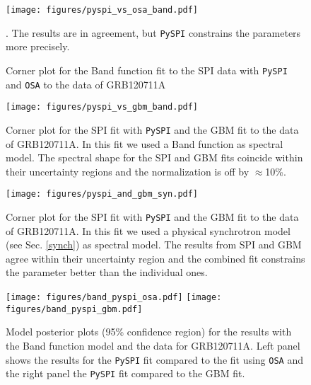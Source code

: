 \documentclass[twocolumn,traditabstract]{aa}
\begin{document}
\begin{figure}
  \begin{centering}
    \texttt{[image: figures/pyspi\_vs\_osa\_band.pdf]}
    \caption{Corner plot for the Band function fit to the SPI data with {\tt PySPI} and {\tt OSA} to the data of GRB120711A}. The results are in agreement, but {\tt PySPI} constrains the parameters more precisely.
    \label{fig:corner_osa_pyspi_band}
  \end{centering}
\end{figure}
\begin{figure}
  \begin{centering}
    \texttt{[image: figures/pyspi\_vs\_gbm\_band.pdf]}
    \caption{Corner plot for the SPI fit with {\tt PySPI} and the GBM fit to the data of GRB120711A. In this fit we used a Band function as spectral model. The spectral shape for the SPI and GBM fits coincide within their uncertainty regions and the normalization is off by $\approx$10\%.}
    \label{fig:corner_gbm_pyspi_band}
  \end{centering}
\end{figure}
\begin{figure}
  \begin{centering}
    \texttt{[image: figures/pyspi\_and\_gbm\_syn.pdf]}
    \caption{Corner plot for the SPI fit with {\tt PySPI} and the GBM fit to the data of GRB120711A. In this fit we used a physical synchrotron model (see Sec. \ref{synch}) as spectral model. The results from SPI and GBM agree within their uncertainty region and the combined fit constrains the parameter better than the individual ones.}
    \label{fig:corner_gbm_pyspi_joined_syn}
  \end{centering}
\end{figure}

\begin{figure*}
  \begin{centering}
    \texttt{[image: figures/band\_pyspi\_osa.pdf]}
    \texttt{[image: figures/band\_pyspi\_gbm.pdf]}
    \caption{Model posterior plots (95\% confidence region) for the results with the Band function model and the data for GRB120711A. Left panel shows the results for the {\tt PySPI} fit compared to the fit using {\tt OSA} and the right panel the {\tt PySPI} fit compared to the GBM fit.}
    \label{fig:model_plot_band}
  \end{centering}
\end{figure*}
\end{document}
